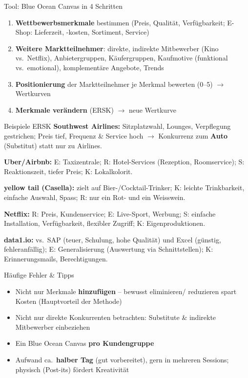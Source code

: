\documentclass[a4paper, fontsize=7pt]{scrartcl}
\begin{document}
\begin{mainbox}{Tool: Blue Ocean Canvas in 4 Schritten}
\begin{enumerate}
    \item \textbf{Wettbewerbsmerkmale} bestimmen (Preis, Qualität,
    Verfügbarkeit; E-Shop: Lieferzeit, -kosten, Sortiment, Service)
    \item \textbf{Weitere Marktteilnehmer}: direkte, indirekte Mitbewerber
    (Kino vs.\ Netflix), Anbietergruppen, Käufergruppen, Kaufmotive
    (funktional vs.\ emotional), komplementäre Angebote, Trends
    \item \textbf{Positionierung} der Marktteilnehmer je Merkmal bewerten
    (0--5) $\to$ Wertkurven
    \item \textbf{Merkmale verändern} (ERSK) $\to$ neue Wertkurve
\end{enumerate}
\end{mainbox}

\begin{subbox}{Beispiele ERSK}
\textbf{Southwest Airlines:} Sitzplatzwahl, Lounges, Verpflegung gestrichen;
Preis tief, Frequenz \& Service hoch $\to$ Konkurrenz zum \textbf{Auto}
(Substitut) statt nur zu Airlines.

\textbf{Uber/Airbnb:} E: Taxizentrale; R: Hotel-Services (Rezeption,
Roomservice); S: Reaktionszeit, tiefer Preis; K: Lokalkolorit.

\textbf{yellow tail (Casella):} zielt auf Bier-/Cocktail-Trinker; K: leichte
Trinkbarkeit, einfache Auswahl, Spass; R: nur ein Rot- und ein Weisswein.

\textbf{Netflix:} R: Preis, Kundenservice; E: Live-Sport, Werbung; S:
einfache Installation, Verfügbarkeit, flexibler Zugriff; K: Eigenproduktionen.

\textbf{data1.io:} vs.\ SAP (teuer, Schulung, hohe Qualität) und Excel
(günstig, fehleranfällig); E: Generalisierung (Auswertung via
Schnittstellen); K: Erinnerungsmails, Berechtigungen.
\end{subbox}

\begin{subbox}{Häufige Fehler \& Tipps}
\begin{itemize}
    \item Nicht nur Merkmale \textbf{hinzufügen} -- bewusst eliminieren/
    reduzieren spart Kosten (Hauptvorteil der Methode)
    \item Nicht nur direkte Konkurrenten betrachten: Substitute \& indirekte
    Mitbewerber einbeziehen
    \item Ein Blue Ocean Canvas \textbf{pro Kundengruppe}
    \item Aufwand ca.\ \textbf{halber Tag} (gut vorbereitet), gern in
    mehreren Sessions; physisch (Post-its) fördert Kreativität
\end{itemize}
\end{subbox}
\end{document}
